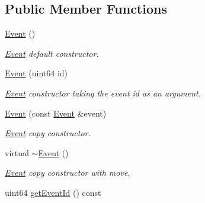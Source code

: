 \subsection*{Public Member Functions}
\begin{DoxyCompactItemize}
\item 
\mbox{\label{class_arcana_1_1_event_a6cf29ea6c699c8841a3bfa8bf64f5623}} 
\mbox{\hyperlink{class_arcana_1_1_event_a6cf29ea6c699c8841a3bfa8bf64f5623}{Event}} ()
\begin{DoxyCompactList}\small\item\em \mbox{\hyperlink{class_arcana_1_1_event}{Event}} default constructor. \end{DoxyCompactList}\item 
\mbox{\label{class_arcana_1_1_event_acb2a15004697399377c3a7c89fe53814}} 
\mbox{\hyperlink{class_arcana_1_1_event_acb2a15004697399377c3a7c89fe53814}{Event}} (uint64 id)
\begin{DoxyCompactList}\small\item\em \mbox{\hyperlink{class_arcana_1_1_event}{Event}} constructor taking the event id as an argument. \end{DoxyCompactList}\item 
\mbox{\label{class_arcana_1_1_event_a41b7ce459a149b541efce98358162899}} 
\mbox{\hyperlink{class_arcana_1_1_event_a41b7ce459a149b541efce98358162899}{Event}} (const \mbox{\hyperlink{class_arcana_1_1_event}{Event}} \&event)
\begin{DoxyCompactList}\small\item\em \mbox{\hyperlink{class_arcana_1_1_event}{Event}} copy constructor. \end{DoxyCompactList}\item 
virtual \mbox{\hyperlink{class_arcana_1_1_event_a5e1da20e67addbcecc0d21032573002e}{$\sim$\+Event}} ()
\begin{DoxyCompactList}\small\item\em \mbox{\hyperlink{class_arcana_1_1_event}{Event}} copy constructor with move. \end{DoxyCompactList}\item 
\mbox{\label{class_arcana_1_1_event_acdd6f2230b6ac5906a7ae9313b272231}} 
uint64 \mbox{\hyperlink{class_arcana_1_1_event_acdd6f2230b6ac5906a7ae9313b272231}{get\+Event\+Id}} () const

\end{DoxyCompactItemize}

